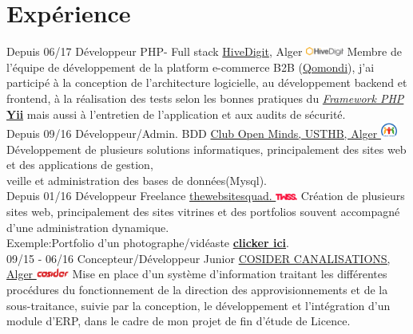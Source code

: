 \documentclass[]{friggeri-cv}
\begin{document}
\section{Expérience}
\begin{entrylist}
  \entry
    {Depuis 06/17}
    {Développeur PHP- Full stack}
    {\href{http://www.hivedigit.com/}{HiveDigit}, Alger \includegraphics[width=35pt]{images/hivedigit.png} }
    {Membre de l'équipe de développement de la platform e-commerce B2B (\href{http://www.demo.b2b-dz.com/}{Qomondi}), j'ai participé à la conception de l'architecture logicielle, au développement backend et frontend, à la réalisation des tests selon les bonnes pratiques du \href{https://fr.wikipedia.org/wiki/Liste_de_frameworks_PHP}{\emph{Framework PHP}} \href{http://www.yiiframework.com/}{\textbf{Yii}} mais aussi à l'entretien de l'application et aux audits de sécurité.\\}
  \entry
    {Depuis 09/16}
    {Développeur/Admin. BDD}
    {\href{http://www.openmindsclub.net/}{Club Open Minds, USTHB, Alger \includegraphics[width=15pt]{images/favicon.png}}}
    {Développement de plusieurs solutions informatiques, principalement des sites web et des applications de gestion,\\veille et administration des bases de données(Mysql).\\}
  \entry
    {Depuis 01/16}
    {Développeur Freelance}
    {\href{http://www.twss.digital/}{thewebsitesquad. \includegraphics[width=20pt]{images/twss.png}}}
    {Création de plusieurs sites web, principalement des sites vitrines et des portfolios souvent accompagné d'une administration dynamique.\\
    Exemple:Portfolio d'un photographe/vidéaste \href{http://www.abafann.com/}{\textbf{clicker ici}}.\\}
  \entry
    {09/15 - 06/16}
    {Concepteur/Développeur Junior}
    {\href{http://www.cosider-groupe.dz/fr/cosider-canalisations}{COSIDER CANALISATIONS, Alger \includegraphics[width=30pt]{images/cosider.png}}}
    {Mise en place d'un système d'information traitant les différentes procédures du fonctionnement de la direction des approvisionnements et de la sous-traitance, suivie par la conception, le développement et l'intégration d'un module d'ERP, dans le cadre de mon projet de fin d'étude de Licence.\\}
  
\end{entrylist}
\end{document}
